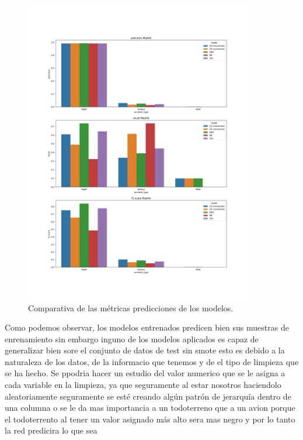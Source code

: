     \begin{figure}[h]
        \centering
        \includegraphics[width=10cm]{archivos/5.Resultados/Comparativa}
        \caption{Comparativa de las métricas predicciones de los modelos.}
        \label{ResultsImage}
     \end{figure}



Como podemos observar, los modelos entrenados predicen bien sus muestras de enrenamiento sin embargo inguno de los modelos aplicados es capaz de generalizar bien sore el conjunto de datos de test sin smote
esto es debido a la naturaleza de los datos, de la informacio que tenemos y de el tipo de limpieza que se ha hecho. Se ppodria hacer un estudio del valor numerico que se le asigna a cada variable en la limpieza, ya que seguramente al estar nosotros haciendolo aleatoriamente seguramente se esté creando algún patrón de jerarquía dentro de una columna o se le da mas importancia a un todoterreno que a un avion porque el todoterrento al tener un valor asignado más alto sera mas negro y por lo tanto la red predicira lo que sea